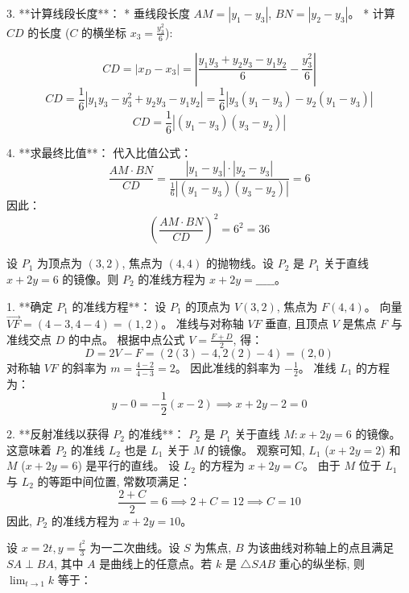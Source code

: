 \begin{questions}
\begin{solution}
3. **计算线段长度**：
* 垂线段长度 $AM = |y_1 - y_3|$, $BN = |y_2 - y_3|$。
* 计算 $CD$ 的长度 ($C$ 的横坐标 $x_3 = \frac{y_3^2}{6}$):

\[ CD = |x_D - x_3| = \left| \frac{y_1 y_3 + y_2 y_3 - y_1 y_2}{6} - \frac{y_3^2}{6} \right| \]
\[ CD = \frac{1}{6} |y_1 y_3 - y_3^2 + y_2 y_3 - y_1 y_2| = \frac{1}{6} |y_3(y_1 - y_3) - y_2(y_1 - y_3)| \]
\[ CD = \frac{1}{6} |(y_1 - y_3)(y_3 - y_2)| \]

4. **求最终比值**：
代入比值公式：
\[ \frac{AM \cdot BN}{CD} = \frac{|y_1 - y_3| \cdot |y_2 - y_3|}{\frac{1}{6} |(y_1 - y_3)(y_3 - y_2)|} = 6 \]
因此：
\[ \left( \frac{AM \cdot BN}{CD} \right)^2 = 6^2 = 36 \]
\end{solution}

\question
设 $P_1$ 为顶点为 $(3, 2)$, 焦点为 $(4, 4)$ 的抛物线。设 $P_2$ 是 $P_1$ 关于直线 $x + 2y = 6$ 的镜像。则 $P_2$ 的准线方程为 $x + 2y = \_\_\_\_\_$。

\begin{solution}
1. **确定 $P_1$ 的准线方程**：
设 $P_1$ 的顶点为 $V(3, 2)$, 焦点为 $F(4, 4)$。
向量 $\vec{VF} = (4-3, 4-4) = (1, 2)$。
准线与对称轴 $VF$ 垂直, 且顶点 $V$ 是焦点 $F$ 与准线交点 $D$ 的中点。
根据中点公式 $V = \frac{F+D}{2}$, 得：
\[ D = 2V - F = (2(3)-4, 2(2)-4) = (2, 0) \]
对称轴 $VF$ 的斜率为 $m = \frac{4-2}{4-3} = 2$。
因此准线的斜率为 $-\frac{1}{2}$。
准线 $L_1$ 的方程为：
\[ y - 0 = -\frac{1}{2}(x - 2) \implies x + 2y - 2 = 0 \]

2. **反射准线以获得 $P_2$ 的准线**：
$P_2$ 是 $P_1$ 关于直线 $M: x + 2y = 6$ 的镜像。
这意味着 $P_2$ 的准线 $L_2$ 也是 $L_1$ 关于 $M$ 的镜像。
观察可知, $L_1$ ($x + 2y = 2$) 和 $M$ ($x + 2y = 6$) 是平行的直线。
设 $L_2$ 的方程为 $x + 2y = C$。
由于 $M$ 位于 $L_1$ 与 $L_2$ 的等距中间位置, 常数项满足：
\[ \frac{2 + C}{2} = 6 \implies 2 + C = 12 \implies C = 10 \]
因此, $P_2$ 的准线方程为 $x + 2y = 10$。
\end{solution}

\question
设 $x = 2t, y = \frac{t^2}{3}$ 为一二次曲线。设 $S$ 为焦点, $B$ 为该曲线对称轴上的点且满足 $SA \perp BA$, 其中 $A$ 是曲线上的任意点。若 $k$ 是 $\triangle SAB$ 重心的纵坐标, 则 $\lim_{t \to 1} k$ 等于：


\end{questions}
